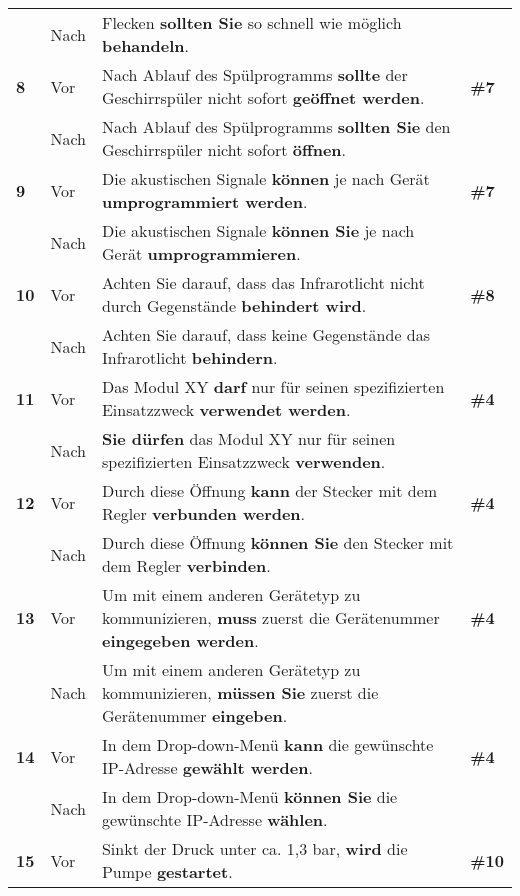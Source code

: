 \begin{longtable}{llp{}l}
& Nach & Flecken \textbf{sollten Sie} so schnell wie möglich \textbf{behandeln}. & \\
\tablevspace
{ \textbf{8}} & Vor & Nach Ablauf des Spülprogramms \textbf{sollte} der Geschirrspüler nicht sofort \textbf{geöffnet werden}. & \textbf{\#7}\\
& Nach & Nach Ablauf des Spülprogramms \textbf{sollten Sie} den Geschirrspüler nicht sofort \textbf{öffnen}. & \\
\tablevspace
{ \textbf{9}} & Vor & Die akustischen Signale \textbf{können} je nach Gerät \textbf{umprogrammiert werden}. & \textbf{\#7}\\
& Nach & Die akustischen Signale \textbf{können Sie} je nach Gerät \textbf{umprogrammieren}. & \\
\tablevspace
{ \textbf{10}} & Vor & Achten Sie darauf, dass das Infrarotlicht nicht durch Gegenstände \textbf{behindert wird}. & \textbf{\#8}\\
& Nach & Achten Sie darauf, dass keine Gegenstände das Infrarotlicht \textbf{behindern}. & \\
\tablevspace
{ \textbf{11}} & Vor & Das Modul XY \textbf{darf} nur für seinen spezifizierten Einsatzzweck \textbf{verwendet werden}. & \textbf{\#4}\\
& Nach & \textbf{Sie dürfen} das Modul XY nur für seinen spezifizierten Einsatzzweck \textbf{verwenden}. & \\
\tablevspace
{ \textbf{12}} & Vor & Durch diese Öffnung \textbf{kann} der Stecker mit dem Regler \textbf{verbunden werden}. & \textbf{\#4}\\
& Nach & Durch diese Öffnung \textbf{können Sie} den Stecker mit dem Regler \textbf{verbinden}. & \\
\tablevspace
{ \textbf{13}} & Vor & Um mit einem anderen Gerätetyp zu kommunizieren, \textbf{muss} zuerst die Gerätenummer \textbf{eingegeben werden}. & \textbf{\#4}\\
& Nach & Um mit einem anderen Gerätetyp zu kommunizieren, \textbf{müssen Sie} zuerst die Gerätenummer \textbf{eingeben}. & \\
\tablevspace
{ \textbf{14}} & Vor & In dem Drop-down-Menü \textbf{kann} die gewünschte IP-Adresse \textbf{gewählt werden}. & \textbf{\#4}\\
& Nach & In dem Drop-down-Menü \textbf{können Sie} die gewünschte IP-Adresse \textbf{wählen}. & \\
\tablevspace
{ \textbf{15}} & Vor & Sinkt der Druck unter ca. 1,3 bar, \textbf{wird} die Pumpe \textbf{gestartet}. & \textbf{\#10}\\

\end{longtable}

